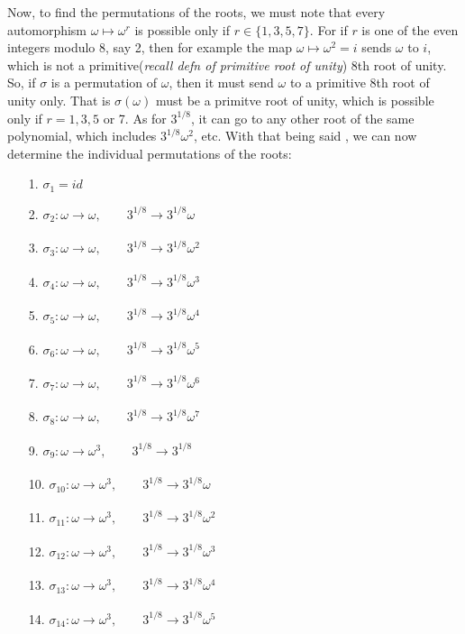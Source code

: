 \documentclass[12pt]{article}
\newcommand{\xmapsto}[2][]{\xrightarrow[#1]{#2}}
\begin{document}
\begin{enumerate}
    Now, to find the permutations of the roots, we must note that every automorphism $\omega \longmapsto\omega^r$ is possible only if $r\in \{1,3,5,7\}$. For if $r$ is one of the even integers modulo 8, say 2, then for example the map $\omega \longmapsto\omega^2=i$ sends $\omega$ to $i$, which is not a primitive(\textit{recall defn of primitive root of unity}) 8th root of unity. So, if $\sigma$ is a permutation of $\omega$, then it must send $\omega$ to a primitive 8th root of unity only. That is $\sigma(\omega)$ must be a primitve root of unity, which is possible only if $r=1,3,5$ or 7. As for $3^{1/8}$, it can go to any other root of the same polynomial, which includes $3^{1/8}\omega^2$, etc. With that being said , we can now determine the individual permutations of the roots: 
    \begin{enumerate}
        \item[1. ] $\sigma_1=id$
        \item[2. ] $\sigma_2: \omega \xmapsto{} \omega,\qquad 3^{1/8} \xmapsto{} 3^{1/8}\omega$
        \item[3. ] $\sigma_3: \omega \xmapsto{} \omega,\qquad 3^{1/8} \xmapsto{} 3^{1/8}\omega^2$
        \item[4. ] $\sigma_4: \omega \xmapsto{} \omega,\qquad 3^{1/8} \xmapsto{} 3^{1/8}\omega^3$
        \item[5. ] $\sigma_5: \omega \xmapsto{} \omega,\qquad 3^{1/8} \xmapsto{} 3^{1/8}\omega^4$
        \item[6. ] $\sigma_6: \omega \xmapsto{} \omega,\qquad 3^{1/8} \xmapsto{} 3^{1/8}\omega^5$
        \item[7. ] $\sigma_7: \omega \xmapsto{} \omega,\qquad 3^{1/8} \xmapsto{} 3^{1/8}\omega^6$
        \item[8. ] $\sigma_8: \omega \xmapsto{} \omega,\qquad 3^{1/8} \xmapsto{} 3^{1/8}\omega^7$
        \item[9. ] $\sigma_9: \omega \xmapsto{} \omega^3,\qquad 3^{1/8} \xmapsto{} 3^{1/8}$
        \item[10. ] $\sigma_{10}: \omega \xmapsto{} \omega^3,\qquad 3^{1/8} \xmapsto{} 3^{1/8}\omega$
        \item[11. ] $\sigma_{11}: \omega \xmapsto{} \omega^3,\qquad 3^{1/8} \xmapsto{} 3^{1/8}\omega^2$
        \item[12. ] $\sigma_{12}: \omega \xmapsto{} \omega^3,\qquad 3^{1/8} \xmapsto{} 3^{1/8}\omega^3$
        \item[13. ] $\sigma_{13}: \omega \xmapsto{} \omega^3,\qquad 3^{1/8} \xmapsto{} 3^{1/8}\omega^4$
        \item[14. ] $\sigma_{14}: \omega \xmapsto{} \omega^3,\qquad 3^{1/8} \xmapsto{} 3^{1/8}\omega^5$

\end{enumerate}
\end{enumerate}
\end{document}
